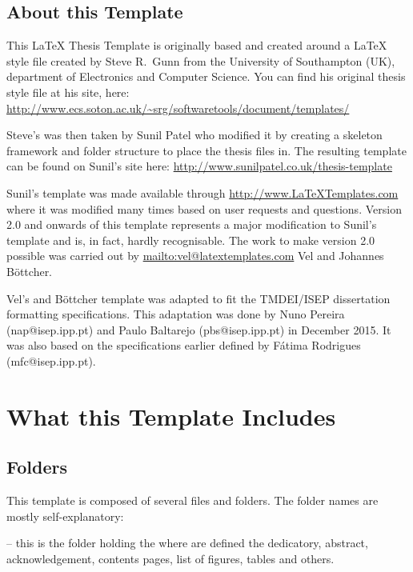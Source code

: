 \subsection{About this Template}

This \LaTeX{} Thesis Template is originally based and created around a \LaTeX{} style file created by Steve R.\ Gunn from the University of Southampton (UK), department of Electronics and Computer Science. You can find his original thesis style file at his site, here:
\url{http://www.ecs.soton.ac.uk/~srg/softwaretools/document/templates/}

Steve's  was then taken by Sunil Patel who modified it by creating a skeleton framework and folder structure to place the thesis files in. The resulting template can be found on Sunil's site here:
\url{http://www.sunilpatel.co.uk/thesis-template}

Sunil's template was made available through \url{http://www.LaTeXTemplates.com} where it was modified many times based on user requests and questions. Version 2.0 and onwards of this template represents a major modification to Sunil's template and is, in fact, hardly recognisable. The work to make version 2.0 possible was carried out by \url{mailto:vel@latextemplates.com} {Vel} and Johannes Böttcher.

Vel's and Böttcher template was adapted to fit the TMDEI/ISEP dissertation formatting specifications. This adaptation was done by Nuno Pereira (nap@isep.ipp.pt) and Paulo Baltarejo (pbs@isep.ipp.pt) in December 2015. It was also based on the specifications earlier defined by Fátima Rodrigues (mfc@isep.ipp.pt).

\section{What this Template Includes}

\subsection{Folders}

This template is composed of several files and folders. The folder names are mostly self-explanatory:

 -- this is the folder holding the  where are defined the dedicatory, abstract, acknowledgement, contents pages, list of figures, tables and others.


